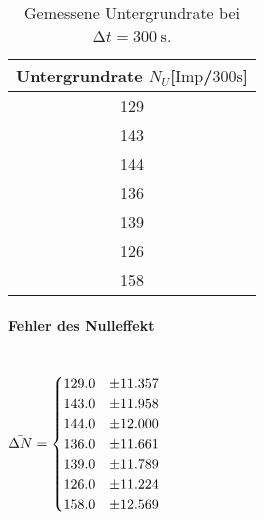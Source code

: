 \begin{table}
\centering
\caption{Gemessene Untergrundrate bei $\increment t = \SI{300}{\second}$\cite{hinweis}.}
\label{tab:ogemessdaten4}
\begin{tabular}{c }
    \toprule
    Untergrundrate $N_{U}$[$\text{Imp}$/$300\si{\second}$] \\
    \midrule
    129 \\
    143 \\
    144 \\
    136 \\
    139 \\
    126 \\ 
    158 \\
    \bottomrule
\end{tabular}
\end{table}

\paragraph{Fehler des Nulleffekt} \mbox{} \\

$\bar{\Delta N} = \begin{cases}
\centering
129.0 & \pm 11.357   \\
143.0 & \pm 11.958    \\
144.0 & \pm 12.000      \\
136.0 & \pm 11.661    \\
139.0 & \pm 11.789   \\
126.0 & \pm 11.224   \\
158.0 & \pm 12.569    
\end{cases}$

